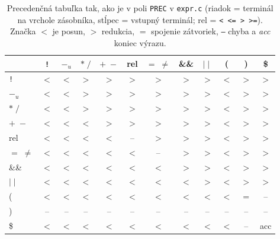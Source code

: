 \begin{table}[!ht]
\centering
\small
\begin{tabular}{l|ccccccccccc}
 & \texttt{!} & $-_u$ & $*\;/$ & $+\;-$ & rel & $=\;\neq$ & \&\& & $\mid\mid$ & ( & ) & \$ \\
\hline
\texttt{!} & $<$ & $<$ & $>$ & $>$ & $>$ & $>$ & $>$ & $>$ & $<$ & $>$ & $>$ \\
$-_u$ & $<$ & $<$ & $>$ & $>$ & $>$ & $>$ & $>$ & $>$ & $<$ & $>$ & $>$ \\
$*\;/$ & $<$ & $<$ & $>$ & $>$ & $>$ & $>$ & $>$ & $>$ & $<$ & $>$ & $>$ \\
$+\;-$ & $<$ & $<$ & $<$ & $>$ & $>$ & $>$ & $>$ & $>$ & $<$ & $>$ & $>$ \\
rel & $<$ & $<$ & $<$ & $<$ & -- & $>$ & $>$ & $>$ & $<$ & $>$ & $>$ \\
$=\;\neq$ & $<$ & $<$ & $<$ & $<$ & $<$ & -- & $>$ & $>$ & $<$ & $>$ & $>$ \\
\&\& & $<$ & $<$ & $<$ & $<$ & $<$ & $<$ & $>$ & $>$ & $<$ & $>$ & $>$ \\
$\mid\mid$ & $<$ & $<$ & $<$ & $<$ & $<$ & $<$ & $<$ & $>$ & $<$ & $>$ & $>$ \\
( & $<$ & $<$ & $<$ & $<$ & $<$ & $<$ & $<$ & $<$ & $<$ & $=$ & -- \\
) & -- & -- & -- & -- & -- & -- & -- & -- & -- & -- & -- \\
\$ & $<$ & $<$ & $<$ & $<$ & $<$ & $<$ & $<$ & $<$ & $<$ & -- & acc \\
\end{tabular}
\caption{Precedenčná tabuľka tak, ako je v poli \texttt{PREC} v \texttt{expr.c} (riadok = terminál na vrchole zásobníka, stĺpec = vstupný terminál; rel = \texttt{< <= > >=}). Značka $<$ je posun, $>$ redukcia, $=$ spojenie zátvoriek, \texttt{--} chyba a \emph{acc} koniec výrazu.}
\end{table}

